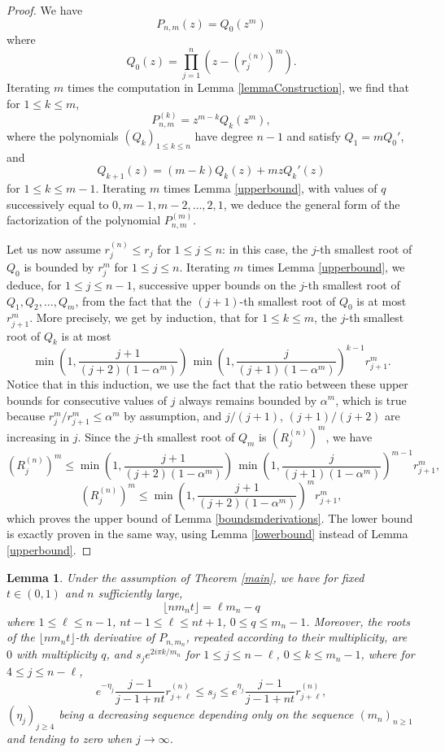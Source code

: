 \documentclass[11pt]{amsart}
\newtheorem{lemma}[theorem]{Lemma}
\begin{document}
\begin{proof}

We have 
$$P_{n,m}(z) = Q_0(z^m)$$
where 
$$Q_0(z) = \prod_{j=1}^n (z - (r_j^{(n)})^m).$$
Iterating $m$ times the computation in Lemma \ref{lemmaConstruction}, we find that for $1 \leq k \leq m$, 
$$P_{n,m}^{(k)} = z^{m-k} Q_k (z^m),$$
where the polynomials $(Q_k)_{1 \leq k \leq n}$ have degree $n-1$ and satisfy $Q_1 = m Q_0'$, and 
$$Q_{k+1} (z) = (m-k) Q_k(z) + m z Q_k'(z) $$
for $1 \leq k \leq m-1$. 
Iterating $m$ times Lemma \ref{upperbound}, with values of $q$ successively
equal to $0, m-1, m-2, \dots, 2, 1$, we
deduce the general form of the factorization of the polynomial $P_{n,m}^{(m)}$. 

Let us now assume $r_j^{(n)} \leq r_j$ for $1 \leq j \leq n$: in this case, the $j$-th smallest root 
of $Q_0$ is bounded by $r_j^m$ for $1 \leq j \leq n$.  
Iterating $m$ times Lemma \ref{upperbound},
we deduce, for $1 \leq j \leq n-1$, 
successive upper bounds 
on the $j$-th smallest root 
of $Q_1, Q_2, \dots, Q_m$, from the 
fact that the $(j+1)$-th smallest root  
of $Q_0$ is at most $r_{j+1}^m$. 
More precisely, we get by induction, that
for $1 \leq k \leq m$, the $j$-th smallest root 
of $Q_k$ is at most 
$$ \min \left(1, \frac{j+1}{(j+2)(1-\alpha^m)} \right) \, \min \left(1, \frac{j}{(j+1)(1-\alpha^m)}  \right)^{k-1} r_{j+1}^m.$$
Notice that in this induction, we use the fact that the ratio between these upper bounds for consecutive values of $j$ always remains bounded 
by $\alpha^m$, which is true because 
$r_j^m /r_{j+1}^m \leq \alpha^m$ by assumption, 
and $j/(j+1)$, $(j+1)/(j+2)$ are increasing in $j$. Since the $j$-th smallest root of $Q_m$ is
$(R_j^{(n)})^m$, we have 
$$ (R_j^{(n)})^m
\leq \min \left(1, \frac{j+1}{(j+2)(1-\alpha^m)} \right) \, \min \left(1, \frac{j}{(j+1)(1-\alpha^m)}  \right)^{m-1} r_{j+1}^m,$$
$$ (R_j^{(n)})^m
\leq \min \left(1, \frac{j+1}{(j+2)(1-\alpha^m)} \right)^m r_{j+1}^m,
$$
which proves the upper bound of Lemma \ref{boundsmderivations}. The lower bound is 
exactly proven in the same way, 
using Lemma \ref{lowerbound} instead of Lemma \ref{upperbound}. 

\end{proof}
\begin{lemma} \label{46}
Under the assumption of Theorem \ref{main}, 
we have for fixed $t \in (0,1)$ and $n$ sufficiently large, $$\lfloor n m_n t \rfloor = \ell m_n - q$$
where $1 \leq \ell \leq n-1$,  $nt - 1 \leq \ell \leq nt + 1$, $0 \leq q \leq m_n-1$.
Moreover, the roots of the $\lfloor n m_n t \rfloor$-th derivative of $P_{n,m_n}$, repeated 
according to their multiplicity, are
$0$ with multiplicity $q$, and 
$s_j e^{2i \pi k/m_n}$
for $1 \leq j \leq n-\ell$, $0 \leq k \leq m_n-1$, where for $4 \leq j \leq n-\ell$, 
$$e^{-\eta_j} \frac{j-1}{j-1 + nt} 
r_{j+\ell}^{(n)} \leq s_j \leq 
e^{\eta_j} \frac{j-1}{j-1 + nt} r^{(n)}_{j+\ell},$$
$(\eta_j)_{j \geq 4}$ being a decreasing sequence 
depending only on the sequence $(m_n)_{n \geq 1}$ and tending to zero when $j \rightarrow \infty$. 



\end{lemma}
\end{document}
